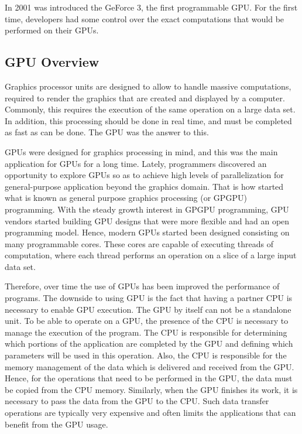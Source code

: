 \documentclass[Ingles]{ic-tese-v1}
\begin{document}
In 2001 was introduced the GeForce 3, the first programmable GPU.
For the first time, developers had some control over the exact computations
that would be performed on their GPUs.

\subsection{GPU Overview}
Graphics processor units are designed to allow to handle massive computations,
required to render the graphics that are created and displayed by a computer.
Commonly, this requires the execution of the same operation on a large data set.
In addition, this processing should be done in real time, and must be completed as
fast as can be done. The GPU was the answer to this.

GPUs were designed for graphics processing in mind, and this was the main application
for GPUs for a long time. Lately, programmers discovered an opportunity
to explore GPUs so as to achieve high levels of parallelization for general-purpose
application beyond the graphics domain.  That is how started
what is known as general purpose graphics processing (or GPGPU) programming.
With the steady growth interest in GPGPU programming, GPU vendors
started building GPU designs that were more flexible and had an open
programming model. Hence,  modern GPUs started been designed  consisting on many
programmable cores. These cores are capable of executing
threads of computation, where each thread performs an operation on a slice of
a large  input data set.

Therefore, over time the use of GPUs has been improved the performance of programs.
The downside to using GPU is
the fact that having a partner CPU is necessary to enable GPU execution.
The GPU by itself can not be a standalone unit. To be able to operate on a GPU, the presence of the CPU is
necessary to manage the execution of the program. The CPU is responsible for
determining which portions of the application are completed by the GPU and defining which
parameters will be used in this operation. Also,
the CPU is responsible for the memory management of the data which is
delivered and received from the GPU. Hence, for  the
operations that need to be performed in the GPU, the data must be copied from the CPU
memory. Similarly, when the GPU finishes its work, it is necessary to pass
the data from the GPU to the CPU. Such data transfer operations are typically  very expensive
and often limits the applications that can benefit from the GPU usage.
\end{document}
